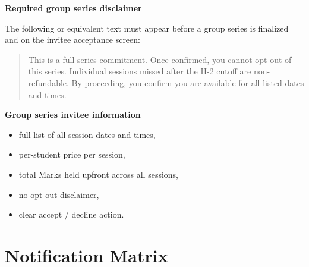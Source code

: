 \documentclass[11pt,a4paper]{article}
\begin{document}
\textbf{Required group series disclaimer}

The following or equivalent text must appear before a group series is finalized and on the invitee acceptance screen:

\begin{quote}
This is a full-series commitment. Once confirmed, you cannot opt out of this series. Individual sessions missed after the H-2 cutoff are non-refundable. By proceeding, you confirm you are available for all listed dates and times.
\end{quote}

\textbf{Group series invitee information}
\begin{itemize}
    \item full list of all session dates and times,
    \item per-student price per session,
    \item total Marks held upfront across all sessions,
    \item no opt-out disclaimer,
    \item clear accept / decline action.
\end{itemize}

\section{Notification Matrix}
\end{document}
